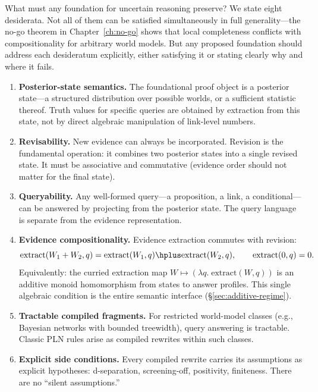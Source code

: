 \documentclass[11pt,openany]{report}
\begin{document}
What must any foundation for uncertain reasoning preserve?  We state
eight desiderata.  Not all of them can be satisfied simultaneously in
full generality---the no-go theorem in Chapter~\ref{ch:no-go} shows
that local completeness conflicts with compositionality for arbitrary
world models.  But any proposed foundation should address each
desideratum explicitly, either satisfying it or stating clearly why and
where it fails.

\begin{enumerate}
\item \textbf{Posterior-state semantics.}  The foundational proof
  object is a posterior state---a structured distribution over possible
  worlds, or a sufficient statistic thereof.  Truth values for specific
  queries are obtained by extraction from this state, not by direct
  algebraic manipulation of link-level numbers.

\item \textbf{Revisability.}  New evidence can always be incorporated.
  Revision is the fundamental operation: it combines two posterior
  states into a single revised state.  It must be associative and
  commutative (evidence order should not matter for the final state).

\item \textbf{Queryability.}  Any well-formed query---a proposition, a
  link, a conditional---can be answered by projecting from the
  posterior state.  The query language is separate from the evidence
  representation.

\item \textbf{Evidence compositionality.}  Evidence extraction commutes
  with revision:
  \[
    \mathrm{extract}(W_1 + W_2, q) = \mathrm{extract}(W_1, q) \hplus
    \mathrm{extract}(W_2, q), \qquad \mathrm{extract}(0, q) = 0.
  \]
  Equivalently: the curried extraction map
  $W \mapsto (\lambda q.\;\mathrm{extract}(W,q))$ is an additive
  monoid homomorphism from states to answer profiles.  This single
  algebraic condition is the entire semantic interface
  (\S\ref{sec:additive-regime}).

\item \textbf{Tractable compiled fragments.}  For restricted
  world-model classes (e.g., Bayesian networks with bounded treewidth),
  query answering is tractable.  Classic PLN rules arise as compiled
  rewrites within such classes.

\item \textbf{Explicit side conditions.}  Every compiled rewrite
  carries its assumptions as explicit hypotheses: d-separation,
  screening-off, positivity, finiteness.  There are no ``silent
  assumptions.''


\end{enumerate}
\end{document}
